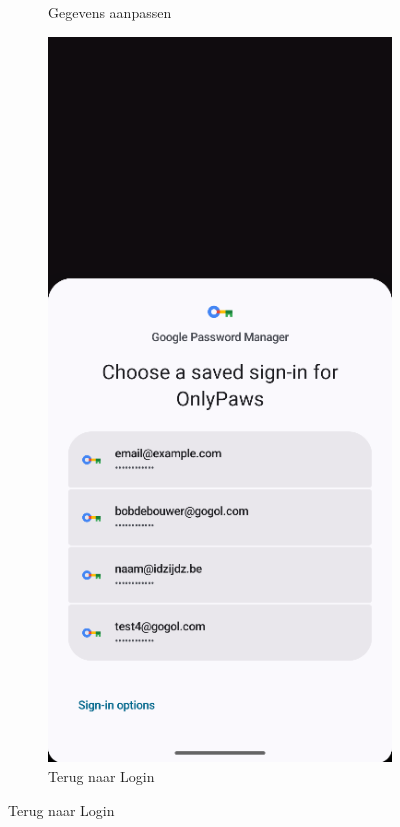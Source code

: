 \documentclass{report}
\begin{document}
\begin{figure}[h]
\begin{subfigure}[b]{0.32\textwidth}
        \caption{Gegevens aanpassen}
    \end{subfigure}
    \hfill
    \begin{subfigure}[b]{0.32\textwidth}
        \includegraphics[width=\textwidth]{DEMO_Acc3.png}
        \caption{Terug naar Login}
    \end{subfigure}
    \hfill
\end{figure}
\end{document}
